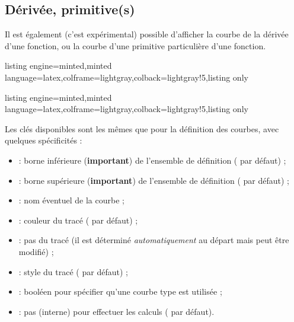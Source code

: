 \documentclass[11pt,a4paper]{ltxdoc}
\begin{document}
\pagebreak

\subsection{Dérivée, primitive(s)}\label{derivprimit}

Il est également (c'est expérimental) possible d'afficher la courbe de la dérivée d'une fonction, ou la courbe d'une primitive particulière d'une fonction.

\begin{tcblisting}{listing engine=minted,minted language=latex,colframe=lightgray,colback=lightgray!5,listing only}
\end{tcblisting}

\begin{tcblisting}{listing engine=minted,minted language=latex,colframe=lightgray,colback=lightgray!5,listing only}
\end{tcblisting}

Les clés disponibles sont les mêmes que pour la définition des courbes, avec quelques spécificités :

\begin{itemize}
  \item {} : borne inférieure (\textbf{important}) de l'ensemble de définition ( par défaut) ;
  \item {} : borne supérieure (\textbf{important}) de l'ensemble de définition ( par défaut) ;
  \item {} : nom éventuel de la courbe ;
  \item {} : couleur du tracé ( par défaut) ;
  \item {} : pas du tracé (il est déterminé \textit{automatiquement} au départ mais peut être modifié) ;
  \item {} : style du tracé ( par défaut) ;
  \item {} : booléen pour spécifier qu'une courbe type \MontreCode{[Spline]} est utilisée ;
  \item {} : pas (interne) pour effectuer les calculs ( par défaut).
\end{itemize}
\end{document}
